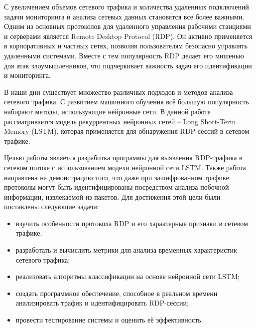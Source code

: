 \documentclass[spec, och, diploma]{SCWorks}
\begin{document}


\tableofcontents

\intro

С увеличением объемов сетевого трафика и количества удаленных подключений задачи мониторинга и анализа сетевых данных становятся все 
более важными. Одним из основных протоколов для удаленного управления рабочими станциями и серверами является Remote Desktop Protocol 
(RDP). Он активно применяется в корпоративных и частных сетях, позволяя пользователям безопасно управлять удаленными системами. Вместе 
с тем популярность RDP делает его мишенью для атак злоумышленников, что подчеркивает важность задач его идентификации и мониторинга.

В наши дни существует множество различных подходов и методов анализа сетевого трафика. С развитием машинного обучения 
всё большую популярность набирают методы, использующие нейронные сети. В данной работе рассматривается модель рекуррентных 
нейронных сетей -- Long Short-Term Memory (LSTM), которая применяется для обнаружения RDP-сессий в сетевом трафике.

Целью работы является разработка программы для выявления RDP-трафика в сетевом потоке с использованием модели нейронной сети 
LSTM. Также работа направлена на демонстрацию того, что даже при зашифрованном трафике протоколы могут быть идентифицированы 
посредством анализа побочной информации, извлекаемой из пакетов. Для достижения этой цели 
были поставлены следующие задачи:

\begin{itemize}
    \item изучить особенности протокола RDP и его характерные признаки в сетевом трафике;
    \item разработать и вычислить метрики для анализа временных характеристик сетевого трафика;
    \item реализовать алгоритмы классификации на основе нейронной сети LSTM;
    \item создать программное обеспечение, способное в реальном времени анализировать трафик и идентифицировать RDP-сессии;
    \item провести тестирование системы и оценить её эффективность.
\end{itemize}
\end{document}
